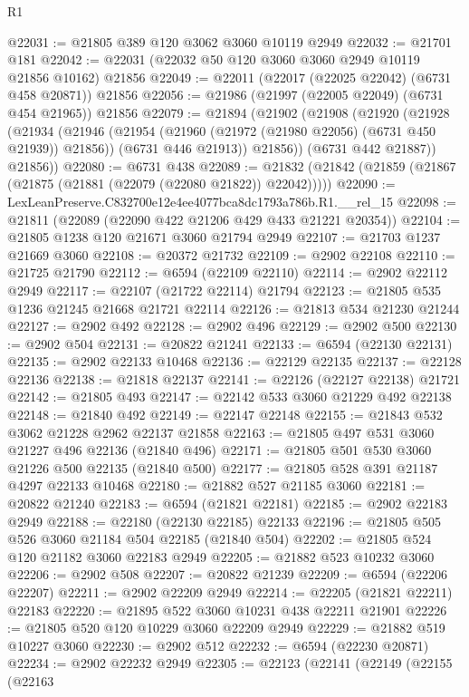 \begin{lexlean}{R1}
\begin{coremodule}
@22031 := @21805 @389 @120 @3062 @3060 @10119 @2949
@22032 := @21701 @181
@22042 := @22031 (@22032 @50 @120 @3060 @3060 @2949 @10119 @21856 @10162) @21856
@22049 := @22011 (@22017 (@22025 @22042) (@6731 @458 @20871)) @21856
@22056 := @21986 (@21997 (@22005 @22049) (@6731 @454 @21965)) @21856
@22079 := @21894
    (@21902
      (@21908
        (@21920
          (@21928
            (@21934
              (@21946
                (@21954 (@21960 (@21972 (@21980 @22056) (@6731 @450 @21939)) @21856))
                (@6731 @446 @21913))
              @21856))
          (@6731 @442 @21887))
        @21856))
@22080 := @6731 @438
@22089 := @21832 (@21842 (@21859 (@21867 (@21875 (@21881 (@22079 (@22080 @21822)) @22042)))))
@22090 := LexLeanPreserve.C832700e12e4ee4077bca8dc1793a786b.R1.__rel_15
@22098 := @21811 (@22089 (@22090 @422 @21206 @429 @433 @21221 @20354))
@22104 := @21805 @1238 @120 @21671 @3060 @21794 @2949
@22107 := @21703 @1237 @21669 @3060
@22108 := @20372 @21732
@22109 := @2902 @22108
@22110 := @21725 @21790
@22112 := @6594 (@22109 @22110)
@22114 := @2902 @22112 @2949
@22117 := @22107 (@21722 @22114) @21794
@22123 := @21805 @535 @1236 @21245 @21668 @21721 @22114
@22126 := @21813 @534 @21230 @21244
@22127 := @2902 @492
@22128 := @2902 @496
@22129 := @2902 @500
@22130 := @2902 @504
@22131 := @20822 @21241
@22133 := @6594 (@22130 @22131)
@22135 := @2902 @22133 @10468
@22136 := @22129 @22135
@22137 := @22128 @22136
@22138 := @21818 @22137
@22141 := @22126 (@22127 @22138) @21721
@22142 := @21805 @493
@22147 := @22142 @533 @3060 @21229 @492 @22138
@22148 := @21840 @492
@22149 := @22147 @22148
@22155 := @21843 @532 @3062 @21228 @2962 @22137 @21858
@22163 := @21805 @497 @531 @3060 @21227 @496 @22136 (@21840 @496)
@22171 := @21805 @501 @530 @3060 @21226 @500 @22135 (@21840 @500)
@22177 := @21805 @528 @391 @21187 @4297 @22133 @10468
@22180 := @21882 @527 @21185 @3060
@22181 := @20822 @21240
@22183 := @6594 (@21821 @22181)
@22185 := @2902 @22183 @2949
@22188 := @22180 (@22130 @22185) @22133
@22196 := @21805 @505 @526 @3060 @21184 @504 @22185 (@21840 @504)
@22202 := @21805 @524 @120 @21182 @3060 @22183 @2949
@22205 := @21882 @523 @10232 @3060
@22206 := @2902 @508
@22207 := @20822 @21239
@22209 := @6594 (@22206 @22207)
@22211 := @2902 @22209 @2949
@22214 := @22205 (@21821 @22211) @22183
@22220 := @21895 @522 @3060 @10231 @438 @22211 @21901
@22226 := @21805 @520 @120 @10229 @3060 @22209 @2949
@22229 := @21882 @519 @10227 @3060
@22230 := @2902 @512
@22232 := @6594 (@22230 @20871)
@22234 := @2902 @22232 @2949
@22305 := @22123
    (@22141
      (@22149
        (@22155
          (@22163

\end{coremodule}
\end{lexlean}
